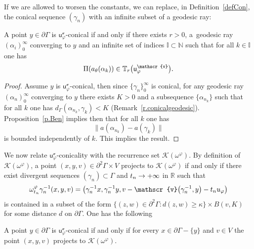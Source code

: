 \documentclass[AHL,Unicode,longabstracts,MathTools]{cedram}
\newcommand{\cartan}{a}
\newcommand{\scr}{\mathscr}
\newcommand{\cc}{\scr{v}}
\renewcommand{\sf}[1]{{\mathsf{#1}}}
\newcommand{\G}{\sf{\Gamma}}
\newcommand{\cal}{\mathcal}
\newcommand{\R}{\mathbb{R}}
\newcommand{\N}{\mathbb{N}}
\newcommand{\T}{\mathbb{T}}
\newcommand{\I}{\mathbb{I}}
\newcommand{\g}{\gamma}
\renewcommand{\t}{\theta}
\newcommand{\bord}{\partial}
\newcommand{\df}{\omega}
\renewcommand{\/}{\backslash}
\newcommand{\<}{\langle}
\renewcommand{\>}{\rangle}
\renewcommand*{\to}{\mathchoice{\longrightarrow}{\rightarrow}{\rightarrow}{\rightarrow}}
\let\originalleft\left
\let\originalright\right
\renewcommand{\left}{\mathopen{}\mathclose\bgroup\originalleft}
\renewcommand{\right}{\aftergroup\egroup\originalright}
\begin{document}
If we are allowed to worsen the constants, we can replace, in Definition~\ref{defCon}, the conical sequence $(\g_n)$ with an infinite subset of a geodesic ray:

\begin{lemm}\label{conGeo}
A point $y\in\bord\G$ is $\sf u_\varphi^\cc$-conical if and only if there exists $r>0$, a~geodesic ray $(\alpha_i)_0^\infty$ converging to $y$ and an infinite set of indices $\I\subset\N$ such that for all $k\in\I$ one has
\[
\Pi(\cartan_\t(\alpha_k))\in\T_r\left(\sf u_\varphi^\cc\right).
\]
\end{lemm}


\begin{proof}
Assume $y$ is $\sf u_\varphi^\cc$-conical, then since $\{\g_n\}_0^\infty$ is conical, for any geodesic ray $(\alpha_n)_0^\infty$ converging to $y$ there exists $K>0$ and a subsequence $\{\alpha_{n_k}\}$ such that for all $k$ one has $d_\G(\alpha_{n_k},\g_{k})<K$ (Remark~\ref{r.conicalgeodesic}). Proposition~\ref{p.Ben} implies then that for all $k$ one has
\[
\|\cartan(\alpha_{n_k})-\cartan(\g_k)\|
\]
is bounded independently of $k$. This implies the result.
\end{proof}

We now relate $\sf u^\cc_\varphi$-conicality with the recurrence set $\cal K(\df^\varphi)$. By definition of $\cal K(\df^\varphi)$, a point $(x,y,v)\in\bord^2\G\times V$ projects to $\cal K(\df^\varphi)$ if and only if there exist divergent sequences $(\g_n)\subset\G$ and $t_n\to+\infty$ in $\R$ such that
\begin{equation}\label{sequence}
\df^{\varphi}_{t_n}\g_n^{-1}(x,y,v)=\left(\g_n^{-1}x,\g_n^{-1}y,v-\cc\left(\g_n^{-1},y\right)-t_nu_{\varphi}\right)
\end{equation}
is contained in a subset of the form $\{(z,w)\in\bord^2\G:d(z,w)\geq\kappa\}\times B(v,K)$ for some distance $d$ on $\bord\G$. One has the following


\begin{prop}\label{conK}
A point $y\in\bord\G$ is $\sf u_\varphi^\cc$-conical if and only if for every $x\in\bord\G-\{y\}$ and $v\in V$ the point $(x,y,v)$ projects to $\cal K(\df^\varphi)$.
\end{prop}
\end{document}
